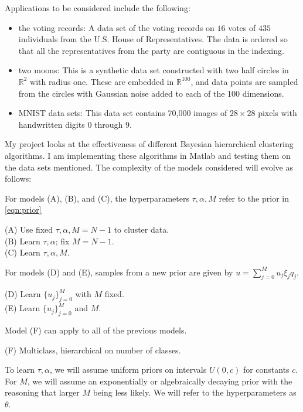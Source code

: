 \documentclass{siamart1116}
\begin{document}
Applications to be considered include the following:
\begin{itemize}
\item the voting records: A data set of the voting records on $16$ votes of $435$ individuals from the U.S. House of Representatives. The data is ordered so that all the representatives from the party are contiguous in the indexing.
\item two moons: This is a synthetic data set constructed with two half circles in $\mathbb{R}^2$ with radius one. These are embedded in $\mathbb{R}^{100}$, and data points are sampled from the circles with Gaussian noise added to each of the 100 dimensions.
\item MNIST data sets: This data set contains 70,000 images of $28 \times 28$ pixels with handwritten digits $0$ through $9$.
\end{itemize}

My project looks at the effectiveness of different Bayesian hierarchical clustering algorithms. I am implementing these algorithms in Matlab and testing them on the data sets mentioned. The complexity of the models considered will evolve as follows:

For models (A), (B), and (C), the hyperparameters $\tau,\alpha,M$ refer to the prior in \cref{eqn:prior}

(A) Use fixed $\tau,\alpha, M=N-1$ to cluster data.\\
(B) Learn $\tau,\alpha$; fix $M=N-1$.\\
(C) Learn $\tau,\alpha,M$.

For models (D) and (E), samples from a new prior are given by $u = \sum_{j=0}^M u_j\xi_j q_j$.

(D) Learn $\{u_j\}_{j=0}^M$ with $M$ fixed.\\
(E) Learn $\{u_j\}_{j=0}^M$ and $M$.

Model (F) can apply to all of the previous models.

(F) Multiclass, hierarchical on number of classes.

To learn $\tau, \alpha$, we will assume uniform priors on intervals $U(0, c)$ for constants $c$. For $M$, we will assume an exponentially or algebraically decaying prior with the reasoning that larger $M$ being less likely. We will refer to the hyperparameters as $\theta$.
\end{document}
